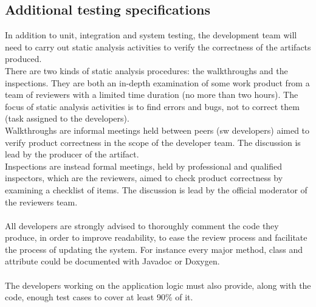 \subsection{Additional testing specifications}
In addition to unit, integration and system testing, the development team will need to carry out static analysis activities to verify the correctness of the artifacts produced.\\ There are two kinds of static analysis procedures: the walkthroughs and the inspections.
They are both an in-depth examination of some work product from a team of reviewers with a limited time duration (no more than two hours). The focus of static analysis activities is to find errors and bugs, not to correct them (task assigned to the developers).\\
Walkthroughs are informal meetings held between peers (sw developers) aimed to verify product correctness in the scope of the developer team. The discussion is lead by the producer of the artifact.\\
Inspections are instead formal meetings, held by professional and qualified inspectors, which are the reviewers, aimed to check product correctness by examining a checklist of items. The discussion is lead by the official moderator of the reviewers team.\\\\
All developers are strongly advised to thoroughly comment the code they produce, in order to improve readability, to ease the review process and facilitate the process of updating the system. For instance every major method, class and attribute could be documented with Javadoc or Doxygen.\\\\
The developers working on the application logic must also provide, along with the code, enough test cases to cover at least 90\% of it.